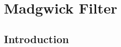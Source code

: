 \documentclass[bare_jrnl_transmag]{subfiles}
\begin{document}
\section{Madgwick Filter}
\subsection{Introduction}
\end{document}
